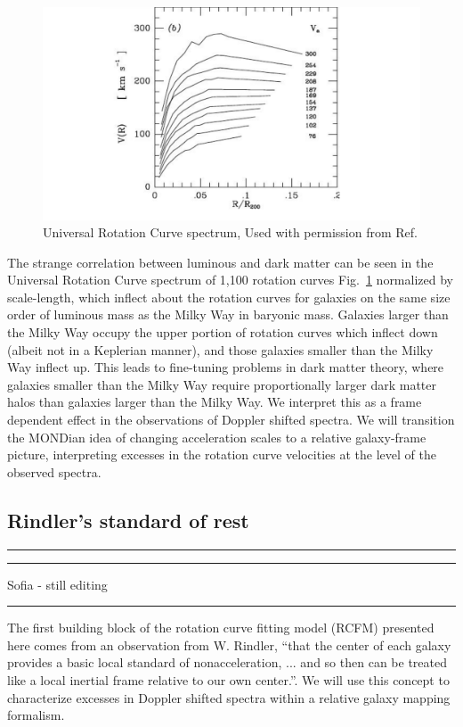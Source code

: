 \documentclass[reprint,%
 amsmath,amssymb,
 aps,
]{revtex4-1}
\begin{document}
\begin{figure}[h!]
     \centering
     \includegraphics[width=\linewidth]{URC}
     \caption{Universal Rotation Curve spectrum, Used with permission from Ref.\citep{salucci}}
     \label{fig:URC}
\end{figure}
The strange correlation between luminous and  dark matter  can be seen in the Universal Rotation Curve spectrum of 1,100 rotation curves Fig.~\ref{fig:URC} normalized by scale-length, which inflect about the rotation curves for galaxies on the same size order of luminous mass as  the Milky Way in baryonic mass. Galaxies larger than the Milky Way occupy the upper portion of rotation curves which inflect down (albeit not in a Keplerian manner), and those galaxies smaller than the Milky Way inflect up.  This leads to fine-tuning problems in  dark matter theory, where
   galaxies smaller than the Milky Way require proportionally larger  dark matter halos than      galaxies larger than the Milky Way.   We interpret this as a frame dependent effect in the observations of Doppler shifted spectra. We will   transition the MONDian idea of changing acceleration scales  to a relative galaxy-frame picture, interpreting excesses in the rotation curve velocities at the level of the observed spectra. 
 

 \subsection{Rindler's standard of rest}
 {\color{teal} \rule{\linewidth}{0.5mm}}
 
{\color{teal} \rule{\linewidth}{0.5mm}}
 
 {\color{teal}Sofia - still editing}
 {\color{teal} \rule{\linewidth}{0.5mm}}
 
The first building block of the rotation curve fitting model (RCFM) presented here comes from an observation from W.    Rindler,    ``that the center of each galaxy provides a basic local standard of nonacceleration, ... and so then can be treated like a local inertial frame relative to our own center.''\cite{rindler2013essential}. 
 We will use this concept  to characterize excesses in Doppler shifted spectra within a relative galaxy mapping formalism.    
 
\end{document}

